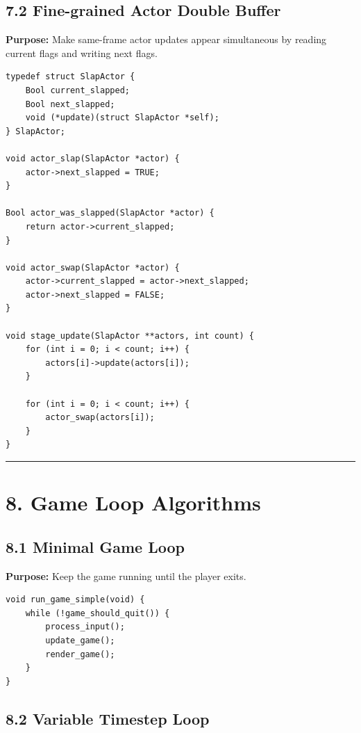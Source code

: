 \documentclass[10pt,letterpaper]{article}
\begin{document}
\subsection{7.2 Fine-grained Actor Double Buffer}

\textbf{Purpose:} Make same-frame actor updates appear simultaneous by reading current flags and writing next flags.

\begin{verbatim}
typedef struct SlapActor {
    Bool current_slapped;
    Bool next_slapped;
    void (*update)(struct SlapActor *self);
} SlapActor;

void actor_slap(SlapActor *actor) {
    actor->next_slapped = TRUE;
}

Bool actor_was_slapped(SlapActor *actor) {
    return actor->current_slapped;
}

void actor_swap(SlapActor *actor) {
    actor->current_slapped = actor->next_slapped;
    actor->next_slapped = FALSE;
}

void stage_update(SlapActor **actors, int count) {
    for (int i = 0; i < count; i++) {
        actors[i]->update(actors[i]);
    }

    for (int i = 0; i < count; i++) {
        actor_swap(actors[i]);
    }
}
\end{verbatim}

\medskip\hrule\medskip

\clearpage
\section{8. Game Loop Algorithms}

\subsection{8.1 Minimal Game Loop}

\textbf{Purpose:} Keep the game running until the player exits.

\begin{verbatim}
void run_game_simple(void) {
    while (!game_should_quit()) {
        process_input();
        update_game();
        render_game();
    }
}
\end{verbatim}

\subsection{8.2 Variable Timestep Loop}
\end{document}

